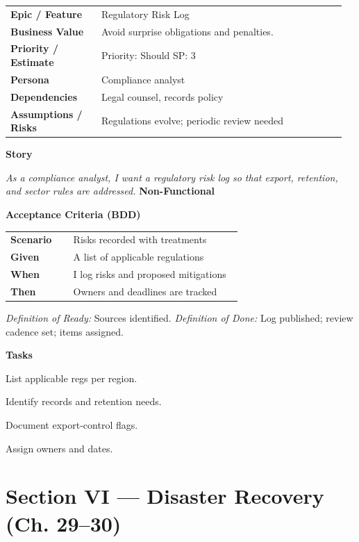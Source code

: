 \documentclass[11pt,letterpaper]{article}
\makeatletter
\newenvironment{kvtable}{%
  \begin{tabular}{@{}>{\bfseries\arraybackslash}p{0.26\linewidth} p{0.70\linewidth}@{}}
}{\end{tabular}}
\newenvironment{bdd}{%
  \begin{tabular}{@{}>{\bfseries\arraybackslash}p{0.26\linewidth} p{0.70\linewidth}@{}}
}{\end{tabular}}
\newcommand{\DoRDoD}[2]{%
  \vspace{0.35em}
  {\footnotesize\color{Muted}%
    \textit{Definition of Ready:} #1 \; \textbullet\;
    \textit{Definition of Done:} #2%
  }%
}
\newenvironment{storycard}[2]{%
  \begin{tcolorbox}[cloudcard, title={#1 --- #2}]%
}{\end{tcolorbox}}
\newcommand{\sectionlabel}[1]{\vspace{0.35em}\textbf{#1}\par}
\makeatother
\begin{document}
\begin{storycard}{CCS-28}{Ch. 28 — Government Regulations \& Compliance Risks}
\begin{kvtable}
Epic / Feature & Regulatory Risk Log\\
Business Value & Avoid surprise obligations and penalties.\\
Priority / Estimate & Priority: Should \quad SP: 3\\
Persona & Compliance analyst\\
Dependencies & Legal counsel, records policy\\
Assumptions / Risks & Regulations evolve; periodic review needed\\
\end{kvtable}
\sectionlabel{Story}
\textit{As a compliance analyst, I want a regulatory risk log so that export, retention, and sector rules are addressed.}
\sectionlabel{Non-Functional}\;
\sectionlabel{Acceptance Criteria (BDD)}
\begin{bdd}
Scenario & Risks recorded with treatments\\
Given & A list of applicable regulations\\
When & I log risks and proposed mitigations\\
Then & Owners and deadlines are tracked\\
\end{bdd}
\DoRDoD{Sources identified.}{Log published; review cadence set; items assigned.}
\sectionlabel{Tasks}
\begin{checklist}
\item List applicable regs per region.
\item Identify records and retention needs.
\item Document export-control flags.
\item Assign owners and dates.
\end{checklist}
\end{storycard}

\section{Section VI — Disaster Recovery (Ch. 29--30)}
\end{document}
